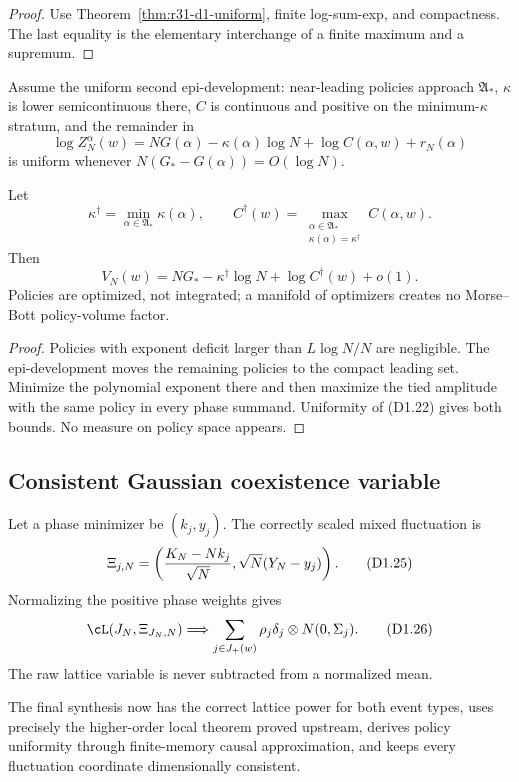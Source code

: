\begin{proof}
Use Theorem~\ref{thm:r31-d1-uniform}, finite log-sum-exp, and compactness.
The last equality is the elementary interchange of a finite maximum and a
supremum.
\end{proof}

Assume the uniform second epi-development: near-leading policies approach
$\mathfrak A_*$, $\kappa$ is lower semicontinuous there, $C$ is continuous and
positive on the minimum-$\kappa$ stratum, and the remainder in
\[
 \log Z_N^\alpha(w)=NG(\alpha)-\kappa(\alpha)\log N
 +\log C(\alpha,w)+r_N(\alpha)                            \tag{D1.22}
\]
is uniform whenever $N(G_*-G(\alpha))=O(\log N)$.

\begin{theorem}
\label{thm:r31-d1-epi}
Let
\[
 \kappa^\dagger=\min_{\alpha\in\mathfrak A_*}\kappa(\alpha),
 \qquad
 C^\dagger(w)=
 \max_{\substack{\alpha\in\mathfrak A_*\\
       \kappa(\alpha)=\kappa^\dagger}}C(\alpha,w).       \tag{D1.23}
\]
Then
\[
 V_N(w)=NG_*-\kappa^\dagger\log N+\log C^\dagger(w)+o(1).              \tag{D1.24}
\]
Policies are optimized, not integrated; a manifold of optimizers creates no
Morse--Bott policy-volume factor.
\end{theorem}

\begin{proof}
Policies with exponent deficit larger than $L\log N/N$ are negligible.
The epi-development moves the remaining policies to the compact leading set.
Minimize the polynomial exponent there and then maximize the tied amplitude
with the same policy in every phase summand.  Uniformity of (D1.22) gives both
bounds.  No measure on policy space appears.
\end{proof}

\subsection{Consistent Gaussian coexistence variable}

Let a phase minimizer be $(k_j,y_j)$.  The correctly scaled mixed fluctuation is
\[
 \Xi_{j,N}=\left({K_N-Nk_j\over\sqrt N},
                 \sqrt N(Y_N-y_j)\right).                 \tag{D1.25}
\]
Normalizing the positive phase weights gives
\[
 \cL(J_N,\Xi_{J_N,N})\Longrightarrow
 \sum_{j\in J_+(w)}\rho_j\delta_j\otimes N(0,\Sigma_j).  \tag{D1.26}
\]
The raw lattice variable is never subtracted from a normalized mean.

The final synthesis now has the correct lattice power for both event types,
uses precisely the higher-order local theorem proved upstream, derives policy
uniformity through finite-memory causal approximation, and keeps every
fluctuation coordinate dimensionally consistent.
